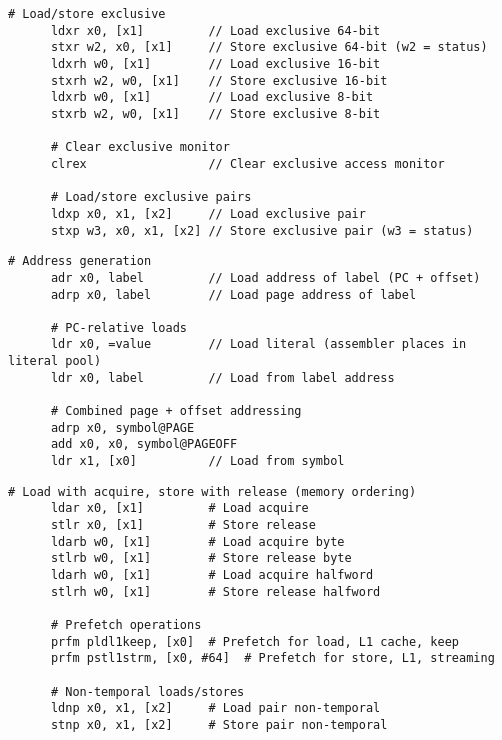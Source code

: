   \begin{definition}
    \begin{lstlisting}[language=arm]
      # Load/store exclusive
      ldxr x0, [x1]         // Load exclusive 64-bit
      stxr w2, x0, [x1]     // Store exclusive 64-bit (w2 = status)
      ldxrh w0, [x1]        // Load exclusive 16-bit
      stxrh w2, w0, [x1]    // Store exclusive 16-bit
      ldxrb w0, [x1]        // Load exclusive 8-bit
      stxrb w2, w0, [x1]    // Store exclusive 8-bit
      
      # Clear exclusive monitor
      clrex                 // Clear exclusive access monitor
      
      # Load/store exclusive pairs
      ldxp x0, x1, [x2]     // Load exclusive pair
      stxp w3, x0, x1, [x2] // Store exclusive pair (w3 = status)
    \end{lstlisting}
  \end{definition}

  \begin{definition}
    \begin{lstlisting}[language=arm]
      # Address generation
      adr x0, label         // Load address of label (PC + offset)
      adrp x0, label        // Load page address of label
      
      # PC-relative loads
      ldr x0, =value        // Load literal (assembler places in literal pool)
      ldr x0, label         // Load from label address
      
      # Combined page + offset addressing
      adrp x0, symbol@PAGE
      add x0, x0, symbol@PAGEOFF
      ldr x1, [x0]          // Load from symbol
    \end{lstlisting}
  \end{definition}

  \begin{definition}
    \begin{lstlisting}[language=arm]
      # Load with acquire, store with release (memory ordering)
      ldar x0, [x1]         # Load acquire
      stlr x0, [x1]         # Store release
      ldarb w0, [x1]        # Load acquire byte
      stlrb w0, [x1]        # Store release byte
      ldarh w0, [x1]        # Load acquire halfword
      stlrh w0, [x1]        # Store release halfword
      
      # Prefetch operations
      prfm pldl1keep, [x0]  # Prefetch for load, L1 cache, keep
      prfm pstl1strm, [x0, #64]  # Prefetch for store, L1, streaming
      
      # Non-temporal loads/stores
      ldnp x0, x1, [x2]     # Load pair non-temporal
      stnp x0, x1, [x2]     # Store pair non-temporal
    \end{lstlisting}
  \end{definition}

